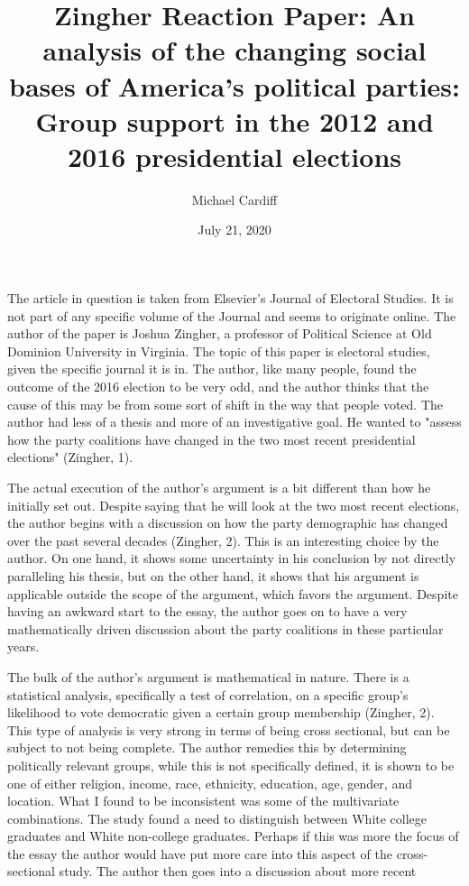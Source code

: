 \documentclass[12pt]{article}
\title{\vspace{-5em} Zingher Reaction Paper: An analysis of the
  changing social bases of America's political parties: Group support
  in the 2012 and 2016 presidential elections}
\author{Michael Cardiff}
\date{July 21, 2020}
\begin{document}
\maketitle
The article in question is taken from Elsevier's Journal of Electoral
Studies. It is not part of any specific volume of the Journal and
seems to originate online. The author of the paper is Joshua Zingher,
a professor of Political Science at Old Dominion University in
Virginia. The topic of this paper is electoral studies, given the
specific journal it is in. The author, like many people, found the
outcome of the 2016 election to be very odd, and the author thinks
that the cause of this may be from some sort of shift in the way that
people voted. The author had less of a thesis and more of an
investigative goal. He wanted to "assess how the party coalitions have
changed in the two most recent presidential elections" (Zingher, 1).
\par
The actual execution of the author's argument is a bit different than
how he initially set out. Despite saying that he will look at the two
most recent elections, the author begins with a discussion on how the
party demographic has changed over the past several decades
(Zingher, 2). This is an interesting choice by the author. On one
hand, it shows some uncertainty in his conclusion by not directly
paralleling his thesis, but on the other hand, it shows that his
argument is applicable outside the scope of the argument, which favors
the argument. Despite having an awkward start to the essay, the author
goes on to have a very mathematically driven discussion about the
party coalitions in these particular years.
\par
The bulk of the author's argument is mathematical in nature. There is
a statistical analysis, specifically a test of correlation, on a
specific group's likelihood to vote democratic given a certain group
membership (Zingher, 2). This type of analysis is very strong in
terms of being cross sectional, but can be subject to not being
complete. The author remedies this by determining politically relevant
groups, while this is not specifically defined, it is shown to be one
of either religion, income, race, ethnicity, education, age, gender,
and location. What I found to be inconsistent was some of the
multivariate combinations. The study found a need to distinguish
between White college graduates and White non-college
graduates. Perhaps if this was more the focus of the essay the author
would have put more care into this aspect of the cross-sectional
study. The author then goes into a discussion about more recent
\end{document}
